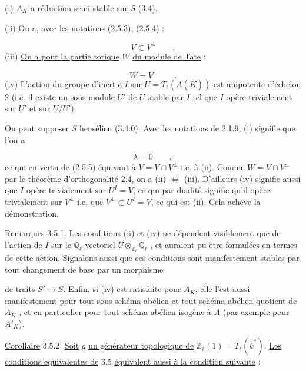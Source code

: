 (i) $A_K$ \underline{a réduction semi-stable sur} $S$ (3.4).

(ii) \underline{On a,} \underline{avec les notations} (2.5.3), (2.5.4) :

\begin{equation*}
V \subset V^{\perp} \qquad .
\end{equation*}
(iii) \underline{On a pour la partie torique} $W$ \underline{du module de Tate} :

\begin{equation*}
W = V^{\perp} \qquad .
\end{equation*}
(iv) \underline{L'action du groupe d'inertie} $I$ \underline{sur} $U = T_{\ell}(A(\overline{K}))$ \underline{est unipotente d'échelon} 2 (\underline{i.e.} \underline{il existe un sous-module} $U'$ \underline{de} $U$ \underline{stable par} $I$ \underline{tel que} $I$ \underline{opère trivialement sur} $U'$ \underline{et sur} $U/U'$).

On peut supposer $S$ hensélien (3.4.0). Avec les notations de 2.1.9, (i) signifie que l'on a

\begin{equation*}
\lambda = 0 \qquad ,
\end{equation*}
ce qui en vertu de (2.5.5) équivaut à $V = V \cap V^{\perp}$ i.e. à (ii). Comme $W=V\cap V^{\perp}$ par le théorème d'orthogonalité 2.4, on a (ii) $\Longleftrightarrow$ (iii). D'ailleurs (iv) signifie aussi que $I$ opère trivialement sur $U^{I} = V$, ce qui par dualité signifie qu'il opère trivialement sur $V^{\perp}$ i.e. que $V^{\perp} \subset U^{I}=V$, ce qui est (ii). Cela achève la démonstration.

\underline{Remarques} 3.5.1. Les conditions (ii) et (iv) ne dépendent visiblement que de l'action de $I$ sur le $\mathbb{Q}_{\ell}$-vectoriel $U \otimes_{\mathbb{Z}_{\ell}} \mathbb{Q}_{\ell}$ , et auraient pu être formulées en termes de cette action. Signalons aussi que ces conditions sont manifestement stables par tout changement de base par un morphisme



de traits $S' \longrightarrow S$. Enfin, si (iv) est satisfaite pour $A_K$, elle l'est aussi manifestement pour tout sous-schéma abélien et tout schéma abélien quotient de $A_K$ , et en particulier pour tout schéma abélien \underline{isogène} à $A$ (par exemple pour $A'_K$).

\underline{Corollaire} 3.5.2. \underline{Soit} $g$ \underline{un générateur topologique de} $\mathbb{Z}_\ell(1) = T_\ell(\overline{k}^*)$. \underline{Les conditions équivalentes de} 3.5 \underline{équivalent aussi à la condition suivante} :


